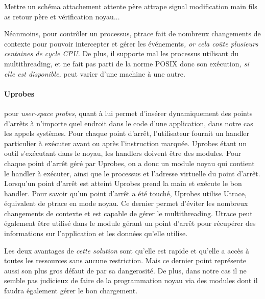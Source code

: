 {\color{red} Mettre un schéma attachement attente père attrape signal
  modification main fils as retour père et vérification noyau...}

Néanmoins, pour contrôler un processus, ptrace fait de nombreux changements de
contexte pour pouvoir intercepter et gérer les événements\textit{, or cela coûte
  plusieurs centaines de cycle CPU.} De plus, il supporte mal les processus
utilisant du multithreading, et ne fait pas parti de la norme POSIX donc son
exécution\textit{, si elle est disponible,} peut varier d'une machine à une
autre.

\paragraph{Uprobes}\cite{INTERCEPTION:AS, INTERCEPTION:MARION}
pour \textit{user-space probes}, quant à lui permet d'insérer dynamiquement des
points d'arrêts à n'importe quel endroit dans le code d'une application, dans
notre cas les appels systèmes. Pour chaque point d'arrêt, l’utilisateur fournit
un handler particulier à exécuter avant ou après l’instruction marquée. Uprobes
étant un outil s'exécutant dans le noyau, les handlers doivent être des
modules. Pour chaque point d'arrêt géré par Uprobes, on a donc un module noyau
qui contient le handler à exécuter, ainsi que le processus et l'adresse
virtuelle du point d'arrêt. Lorsqu'un point d'arrêt est atteint Uprobes prend la
main et exécute le bon handler. Pour savoir qu'un point d'arrêt a été touché,
Uprobes utilise Utrace, équivalent de ptrace en mode noyau. Ce dernier permet
d'éviter les nombreux changements de contexte et est capable de gérer le
multithreading. Utrace peut également être utilisé dans le module gérant un
point d'arrêt pour récupérer des informations sur l'application et les données
qu'elle utilise.

Les deux avantages de \textit{cette solution} sont qu'elle est rapide et qu'elle a accès à
toutes les ressources sans aucune restriction. Mais ce dernier point représente
aussi son plus gros défaut de par sa dangerosité. De plus, dans notre cas il ne
semble pas judicieux de faire de la programmation noyau via des modules dont il
faudra également gérer le bon chargement.

